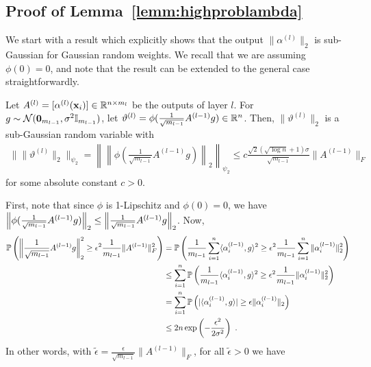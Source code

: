 


\subsection{Proof of Lemma~\ref{lemm:highproblambda}}
\label{ssec:highprobablambda}
We start with a result which explicitly shows that the output $\| \alpha^{(l)}\|_2$ is sub-Gaussian for Gaussian random weights. We recall that we are assuming $\phi(0)=0$, and note that the result can be extended to the general case straightforwardly.

\begin{lemm}
Let $A^{(l)} = [ \alpha^{(l)}(\x_i)] \in \R^{n \times m_l}$ be the outputs of layer $l$.
For $g \sim \cN(\bm{0}_{m_{l-1}},\sigma^2 \I_{m_{l-1}})$, let $\vartheta^{(l)} = \phi(\frac{1}{\sqrt{m_{l-1}}} A^{(l-1)} g ) \in \R^{n}$. Then, $\| \vartheta^{(l)}\|_2$ is a sub-Gaussian random variable with 
\begin{align*}
\| \|\vartheta^{(l)}\|_2 \|_{\psi_2} = \left\| \left\| \phi\left(\frac{1}{\sqrt{m_{l-1}}} A^{(l-1)} g \right) \right\|_2 \right\|_{\psi_2}\leq c \frac{\sqrt{2} (\sqrt{\log n} + 1)\sigma}{\sqrt{m_{l-1}}} \| A^{(l-1)} \|_F
\end{align*}
for some absolute constant $c>0$.
\label{lemm:gammasubg}
\end{lemm}
\proof First, note that since $\phi$ is 1-Lipschitz and $\phi(0) = 0$, we have $\norm{\phi( \frac{1}{\sqrt{m_{l-1}}} A^{(l-1)} g )}_2 \leq \norm{\frac{1}{\sqrt{m_{l-1}}} A^{(l-1)} g}_2$. Now, 
\begin{align*}
\P  \left( \left\| \frac{1}{\sqrt{m_{l-1}}} A^{(l-1)} g \right\|_2^2 \geq \epsilon^2 \frac{1}{m_{l-1}} \| A^{(l-1)} \|_F^2 \right)
 &= \P \left( \frac{1}{m_{l-1}} \sum_{i=1}^n \langle \alpha_i^{(l-1)}, g \rangle^2 \geq \epsilon^2 \frac{1}{m_{l-1}} \sum_{i=1}^n \| \alpha_i^{(l-1)} \|_2^2 \right)\\
& \leq \sum_{i=1}^n \P \left( \frac{1}{m_{l-1}} \langle \alpha_i^{(l-1)}, g \rangle^2 \geq \epsilon^2 \frac{1}{m_{l-1}} \| \alpha_i^{(l-1)} \|_2^2 \right) \\
& = \sum_{i=1}^n \P \left( |\langle \alpha_i^{(l-1)}, g \rangle| \geq \epsilon \| \alpha_i^{(l-1)} \|_2 \right)\\
& \leq 2n \exp\left( - \frac{\epsilon^2}{2\sigma^2} \right)~.
\end{align*}
In other words, with $\tilde{\epsilon} = \frac{\epsilon}{\sqrt{m_{l-1}}} \| A^{(l-1)} \|_F$, for all $\tilde{\epsilon} > 0$ we have 

